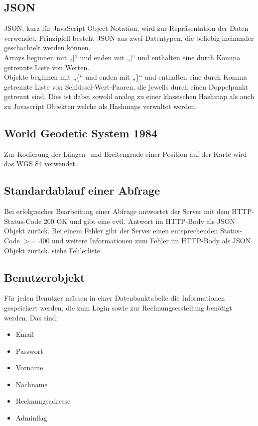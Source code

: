 \documentclass[ngerman,titlepage,parskip=true]{scrartcl}
\begin{document}
	\subsection{JSON}
	 
	JSON, kurz für JavaScript Object Notation, wird zur Repräsentation der Daten verwendet.
	Prinzipiell besteht JSON aus zwei Datentypen, die beliebig ineinander geschachtelt werden können. \\
	Arrays beginnen mit „[“ und enden mit „]“ und enthalten eine durch Komma getrennte Liste von Werten. \\
	Objekte beginnen mit „\{“ und enden mit „\}“ und enthalten eine durch Komma getrennte Liste von Schlüssel-Wert-Paaren, die jeweils durch einen Doppelpunkt getrennt sind.
	Dies ist dabei sowohl analog zu einer klassischen Hashmap als auch zu Javascript Objekten welche als Hashmaps verwaltet werden.
	
	\subsection{World Geodetic System 1984}
	
	Zur Kodierung der Längen- und Breitengrade einer Position auf der Karte wird das WGS 84 verwendet.
	
	\subsection{Standardablauf einer Abfrage}
	Bei erfolgreicher Bearbeitung einer Abfrage antwortet der Server mit dem HTTP-Status-Code 200 OK und gibt eine evtl. Antwort im HTTP-Body als JSON Objekt zurück. Bei einem Fehler gibt der Server einen entsprechenden Status-Code $>$= 400 und weitere Informationen zum Fehler im HTTP-Body als JSON Objekt zurück. siehe Fehlerliste %


	\subsection{Benutzerobjekt}
	Für jeden Benutzer müssen in einer Datenbanktabelle die Informationen gespeichert werden, die zum Login sowie zur Rechnungserstellung benötigt werden. 
	Das sind:
	
	\begin{itemize}
		\item Email
		\item Passwort
		\item Vorname
		\item Nachname
		\item Rechnungsadresse
		\item Adminflag
	\end{itemize}
	
\end{document}
